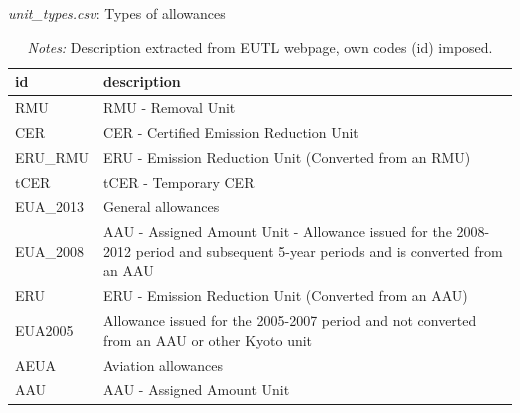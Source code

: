 \documentclass[authoryear]{elsarticle}
\begin{document}
\begin{table}[htbp]\scriptsize
	\caption{\textit{unit\_types.csv}: Types of allowances}\label{tab:unitType}
	\centering
	\begin{tabular*}{\textwidth}{@{}@{\extracolsep{\fill}} lp{10cm} @{}}
		\toprule
		\toprule
		\textbf{id} & \textbf{description} \\
		\midrule
		RMU   & RMU - Removal Unit \\
		CER   & CER - Certified Emission Reduction Unit \\
		ERU\_RMU & ERU - Emission Reduction Unit (Converted from an RMU) \\
		tCER  & tCER - Temporary CER \\
		EUA\_2013 & General allowances \\
		EUA\_2008 & AAU - Assigned Amount Unit - Allowance issued for the 2008-2012 period and subsequent 5-year periods and is converted from an AAU \\
		ERU   & ERU - Emission Reduction Unit (Converted from an AAU) \\
		EUA2005 & Allowance issued for the 2005-2007 period and not converted from an AAU or other Kyoto unit \\
		AEUA  & Aviation allowances \\
		AAU   & AAU - Assigned Amount Unit \\
		\bottomrule
		\bottomrule
	\end{tabular*}%
	\vspace{-3ex}
	\caption*{\footnotesize \emph{Notes:} Description extracted from EUTL webpage, own codes (id) imposed.}
	\vspace{0ex}
\end{table}%
\end{document}
